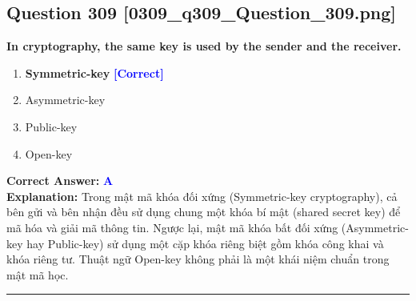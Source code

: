 \documentclass[11pt,a4paper]{article}
\begin{document}
\begin{minipage}{\textwidth}
\subsection*{Question 309 \quad \footnotesize{[0309\_q309\_Question\_309.png]}}
\noindent \textbf{In cryptography, the same key is used by the sender and the receiver.}

\begin{enumerate}[label=\Alph*.]
    \item \textbf{Symmetric-key} \hfill \textcolor{blue}{\textbf{[Correct]}}
    \item Asymmetric-key
    \item Public-key
    \item Open-key
\end{enumerate}

\noindent \textbf{Correct Answer:} \textcolor{blue}{\textbf{A}} \\[2pt]
\noindent \textbf{Explanation:} Trong mật mã khóa đối xứng (Symmetric-key cryptography), cả bên gửi và bên nhận đều sử dụng chung một khóa bí mật (shared secret key) để mã hóa và giải mã thông tin. Ngược lại, mật mã khóa bất đối xứng (Asymmetric-key hay Public-key) sử dụng một cặp khóa riêng biệt gồm khóa công khai và khóa riêng tư. Thuật ngữ Open-key không phải là một khái niệm chuẩn trong mật mã học.

\par\vspace{0.3cm}
\hrule
\vspace{0.3cm}
\end{minipage}
\end{document}
